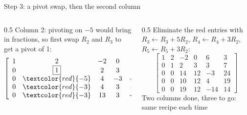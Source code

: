 \ifdefined\PRESENTATION\else\PassOptionsToClass{handout}{beamer}\fi\documentclass[aspectratio=169, lualatex]{beamer}
\begin{document}
\begin{frame}{Step 3: a pivot swap, then the second column}
	\begin{columns}[c]
		\begin{column}{0.5\textwidth}
			Column 2: pivoting on $-5$ would bring in fractions, so first swap $R_2$ and $R_3$ to get a pivot of 1:
			\[
				\left[\begin{array}{ccccc|c}
						1 & 2                   & -2 & 0  & 6   & 3   \\
						0 & \boxed{1}           & 2  & 3  & 3   & 7   \\
						0 & \textcolor{red}{-5} & 4  & -3 & -18 & -11 \\
						0 & \textcolor{red}{-3} & 4  & 3  & -5  & -2  \\
						0 & \textcolor{red}{-3} & 13 & 3  & -23 & -7
					\end{array}\right]
			\]
		\end{column}
		\begin{column}{0.5\textwidth}
			Eliminate the red entries with $R_3 \leftarrow R_3 + 5R_2$, $R_4 \leftarrow R_4 + 3R_2$, $R_5 \leftarrow R_5 + 3R_2$:
			\[
				\left[\begin{array}{ccccc|c}
						1 & 2 & -2 & 0  & 6   & 3  \\
						0 & 1 & 2  & 3  & 3   & 7  \\
						0 & 0 & 14 & 12 & -3  & 24 \\
						0 & 0 & 10 & 12 & 4   & 19 \\
						0 & 0 & 19 & 12 & -14 & 14
					\end{array}\right]
			\]
			Two columns done, three to go: same recipe each time
		\end{column}
	\end{columns}
\end{frame}
\end{document}
